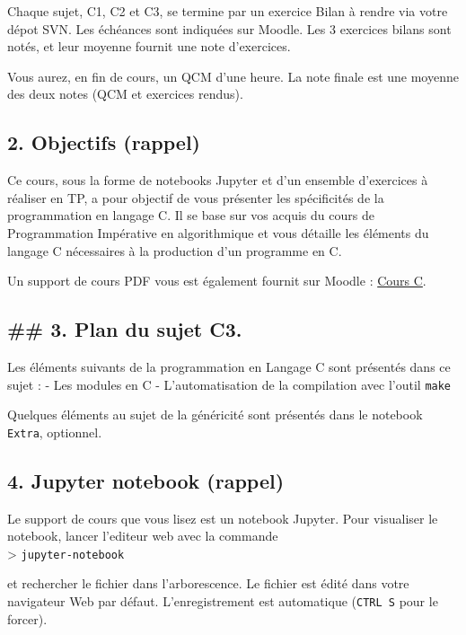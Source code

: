 \documentclass[11pt]{article}
\begin{document}
Chaque sujet, C1, C2 et C3, se termine par un exercice Bilan à rendre
via votre dépot SVN. Les échéances sont indiquées sur Moodle. Les 3
exercices bilans sont notés, et leur moyenne fournit une note
d'exercices.

Vous aurez, en fin de cours, un QCM d'une heure. La note finale est une
moyenne des deux notes (QCM et exercices rendus).

    \subsection{2. Objectifs (rappel)}\label{objectifs-rappel}

Ce cours, sous la forme de notebooks Jupyter et d'un ensemble
d'exercices à réaliser en TP, a pour objectif de vous présenter les
spécificités de la programmation en langage C. Il se base sur vos acquis
du cours de Programmation Impérative en algorithmique et vous détaille
les éléments du langage C nécessaires à la production d'un programme en
C.

Un support de cours PDF vous est également fournit sur Moodle :
\href{http://moodle-n7.inp-toulouse.fr/pluginfile.php/49240/mod_resource/content/5/LangageC_poly.pdf}{Cours
C}.

    \subsection{\#\# 3. Plan du sujet C3.}\label{plan-du-sujet-c3.}

Les éléments suivants de la programmation en Langage C sont présentés
dans ce sujet : - Les modules en C - L'automatisation de la compilation
avec l'outil \texttt{make}

Quelques éléments au sujet de la généricité sont présentés dans le
notebook \texttt{Extra}, optionnel.

    \subsection{4. Jupyter notebook (rappel)}\label{jupyter-notebook-rappel}

Le support de cours que vous lisez est un notebook Jupyter. Pour
visualiser le notebook, lancer l'editeur web avec la commande\\
\textgreater{} \texttt{jupyter-notebook}

et rechercher le fichier dans l'arborescence. Le fichier est édité dans
votre navigateur Web par défaut. L'enregistrement est automatique
(\texttt{CTRL\ S} pour le forcer).
\end{document}

